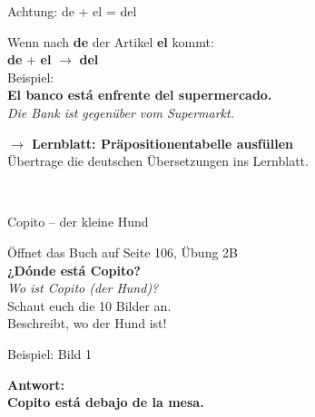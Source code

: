 \documentclass[aspectratio=169,11pt]{beamer}
\newcommand{\es}[1]{\textcolor{spanisch}{\textbf{#1}}}
\newcommand{\de}[1]{\textcolor{dunkelgrau}{\textit{#1}}}
\newcommand{\phase}[1]{\begin{center}\colorbox{spanisch}{\textcolor{white}{\large\bfseries #1}}\end{center}}
\begin{document}
\begin{frame}{Achtung: de + el = del}
\begin{center}
{\Large Wenn nach \es{de} der Artikel \es{el} kommt:}\\[1cm]
{\LARGE \es{de} + \es{el} $\rightarrow$ \es{del}}\\[1cm]
\pause
{\Large Beispiel:}\\[0.5cm]
{\Large \es{El banco está enfrente \textbf{del} supermercado.}}\\
{\normalsize \de{Die Bank ist gegenüber vom Supermarkt.}}
\end{center}
\end{frame}

\begin{frame}{}
\begin{center}
{\Large\bfseries $\rightarrow$ Lernblatt: Präpositionentabelle ausfüllen}\\[1cm]
{\normalsize Übertrage die deutschen Übersetzungen ins Lernblatt.}
\end{center}
\end{frame}


\begin{frame}{}
\phase{Übung 1: ¿Dónde está Copito?}
\end{frame}

\begin{frame}{Copito – der kleine Hund}
\begin{center}
{\Large Öffnet das Buch auf Seite 106, Übung 2B}\\[1cm]
{\LARGE \es{¿Dónde está Copito?}}\\
{\normalsize \de{Wo ist Copito (der Hund)?}}\\[1cm]
{\Large Schaut euch die 10 Bilder an.}\\[0.5cm]
{\Large Beschreibt, wo der Hund ist!}
\end{center}
\end{frame}

\begin{frame}{Beispiel: Bild 1}
\begin{center}

\vspace{0.8cm}
\pause
{\Large\bfseries Antwort:}\\[0.3cm]
{\Large \es{Copito está debajo de la mesa.}}
\end{center}
\end{frame}
\end{document}
